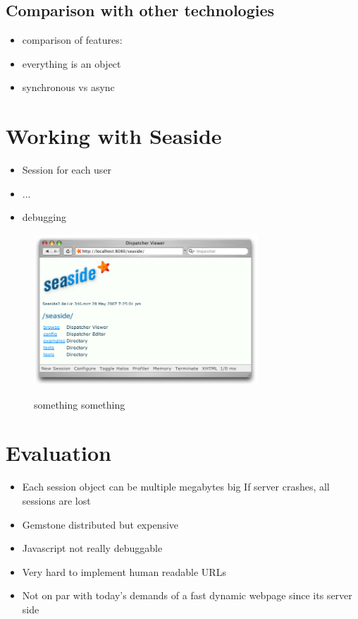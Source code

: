 \documentclass[a4paper,12pt,pagesize,headsepline,bibtotoc,titlepage]{scrartcl}
\begin{document}
\subsection{Comparison with other technologies}

\begin{itemize}
\item comparison of features:
\item everything is an object
\item synchronous vs async
\end{itemize}


\section{Working with Seaside}
\label{sec:workflow}


\begin{itemize}
\item Session for each user
\item ...
\item debugging
\end{itemize}

\begin{figure}[hbp]
\begin{center}
\includegraphics*[width=0.75\textwidth]{images/toolbar.png}\\
\caption{something something}
\label{abb:test}
\end{center}
\end{figure}

\section{Evaluation}
\label{sec:evaluation}

\begin{itemize}
\item Each session object can be multiple megabytes big If server crashes, all sessions are lost
\item Gemstone distributed but expensive
\item Javascript not really debuggable
\item Very hard to implement human readable URLs
\item Not on par with today’s demands of a fast dynamic webpage since its server side
\end{itemize}
\end{document}
